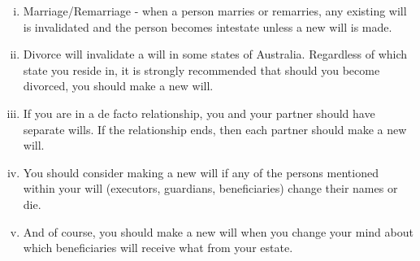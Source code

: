 \documentclass[12pt,a4paper]{article}
\begin{document}
\begin{enumerate}
	\begin{enumerate}[i.]
		\item Marriage/Remarriage - when a person marries or remarries, any existing will is invalidated and the person becomes intestate unless a new will is made.
		\item Divorce will invalidate a will in some states of Australia. Regardless of which state you reside in, it is strongly recommended that should you become divorced, you should make a new will.
		\item If you are in a de facto relationship, you and your partner should have separate wills. If the relationship ends, then each partner should make a new will.
		\item You should consider making a new will if any of the persons mentioned within your will (executors, guardians, beneficiaries) change their names or die.
		\item And of course, you should make a new will when you change your mind about which beneficiaries will receive what from your estate.
	\end{enumerate}
\end{enumerate}
\vfill
\end{document}
